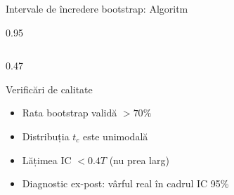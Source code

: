 \documentclass[9pt, aspectratio=169, t]{beamer}
\begin{document}
\begin{frame}{Intervale de încredere bootstrap: Algoritm}
\begin{cminipage}{0.95\textwidth}
{\begin{columns}[T]
\begin{column}{0.47\textwidth}
            \begin{exampleblock}{Verificări de calitate}
                \begin{itemize}\setlength{\itemsep}{0pt}
                    \item Rata bootstrap validă $> 70\%$
                    \item Distribuția $t_c$ este unimodală
                    \item Lățimea IC $< 0.4T$ (nu prea larg)
                    \item Diagnostic ex-post: vârful real în cadrul IC 95\%
                \end{itemize}
            \end{exampleblock}
        \end{column}
    \end{columns}
    }
    \hfill{}
    \end{cminipage}
\end{frame}
\end{document}
